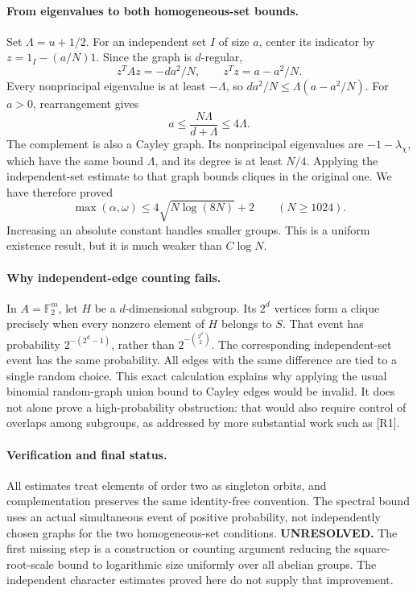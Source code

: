\documentclass[11pt,a4paper]{article}
\begin{document}
\paragraph{From eigenvalues to both homogeneous-set bounds.}
Set $\Lambda=u+1/2$. For an independent set $I$ of size $a$, center
its indicator by $z=1_I-(a/N)1$. Since the graph is $d$-regular,
\[
 z^TAz=-da^2/N,\qquad z^Tz=a-a^2/N.
\]
Every nonprincipal eigenvalue is at least $-\Lambda$, so
$da^2/N\le\Lambda(a-a^2/N)$. For $a>0$, rearrangement gives
\[
 a\le\frac{N\Lambda}{d+\Lambda}\le4\Lambda.
\]
The complement is also a Cayley graph. Its nonprincipal eigenvalues
are $-1-\lambda_\chi$, which have the same bound $\Lambda$, and its
degree is at least $N/4$. Applying the independent-set estimate to
that graph bounds cliques in the original one. We have therefore proved
\[
 \max(\alpha,\omega)\le4\sqrt{N\log(8N)}+2
 \qquad(N\ge1024).
\]
Increasing an absolute constant handles smaller groups. This is a
uniform existence result, but it is much weaker than $C\log N$.

\paragraph{Why independent-edge counting fails.}
In $A=\mathbb F_2^m$, let $H$ be a $d$-dimensional subgroup. Its
$2^d$ vertices form a clique precisely when every nonzero element of
$H$ belongs to $S$. That event has probability
$2^{-(2^d-1)}$, rather than $2^{-\binom{2^d}{2}}$. The corresponding
independent-set event has the same probability. All edges with the
same difference are tied to a single random choice. This exact
calculation explains why applying the usual binomial random-graph
union bound to Cayley edges would be invalid. It does not alone
prove a high-probability obstruction: that would also require control
of overlaps among subgroups, as addressed by more substantial work
such as [R1].

\paragraph{Verification and final status.}
All estimates treat elements of order two as singleton orbits, and
complementation preserves the same identity-free convention. The
spectral bound uses an actual simultaneous event of positive probability,
not independently chosen graphs for the two homogeneous-set conditions.
\textbf{UNRESOLVED.} The first missing step is a construction or counting
argument reducing the square-root-scale bound to logarithmic size
uniformly over all abelian groups. The independent character estimates
proved here do not supply that improvement.
\end{document}
